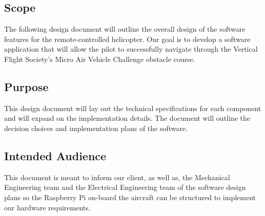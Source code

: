 \documentclass[onecolumn, oneside, letterpaper, draftclsnofoot, 10pt, compsoc]{IEEEtran}
\begin{document}
\subsection{Scope}
\label{sec:Scope}
The following design document will outline the overall design of the software features for the remote-controlled helicopter. Our goal is to develop a software application that will allow the pilot to successfully navigate through the Vertical Flight Society's Micro Air Vehicle Challenge obstacle course.
\subsection{Purpose}
This design document will lay out the technical specifications for each component and will expand on the implementation details. The document will outline the decision choices and implementation plans of the software.

\subsection{Intended Audience}
This document is meant to inform our client, as well as, the Mechanical Engineering team and the Electrical Engineering team of the software design plans so the Raspberry Pi on-board the aircraft can be structured to implement our hardware requirements.
\end{document}
